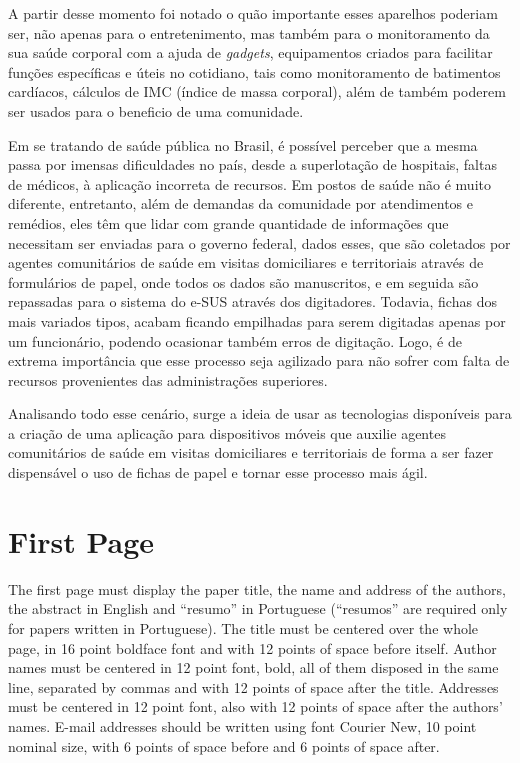 \documentclass[12pt]{article}
\begin{document}
A partir desse momento foi notado o quão importante esses aparelhos poderiam ser, não apenas para o entretenimento, mas também para o monitoramento da sua saúde corporal com a ajuda de \textit{gadgets}, equipamentos criados para facilitar funções específicas e úteis no cotidiano, tais como monitoramento de batimentos cardíacos, cálculos de IMC (índice de massa corporal), além de também poderem ser usados para o beneficio de uma comunidade.

Em se tratando de saúde pública no Brasil, é possível perceber que a mesma passa por imensas dificuldades no país, desde a superlotação de hospitais, faltas de médicos, à aplicação incorreta de recursos. Em postos de saúde não é muito diferente, entretanto, além de demandas da comunidade por atendimentos e remédios, eles têm que lidar com grande quantidade de informações que necessitam ser enviadas para o governo federal, dados esses, que são coletados por agentes comunitários de saúde em visitas domiciliares e territoriais através de formulários de papel, onde todos os dados são manuscritos, e em seguida são repassadas para o sistema do e-SUS através dos digitadores.
Todavia, fichas dos mais variados tipos, acabam ficando empilhadas para serem digitadas apenas por um funcionário, podendo ocasionar também erros de digitação.  Logo, é de extrema importância que esse processo seja agilizado para não sofrer com falta de recursos provenientes das administrações superiores.

Analisando todo esse cenário, surge a ideia de usar as tecnologias disponíveis para a criação de uma aplicação para dispositivos móveis que auxilie agentes comunitários de saúde em visitas domiciliares e territoriais de forma a ser fazer dispensável o uso de fichas de papel e tornar esse processo mais ágil.

\section{First Page} \label{sec:firstpage}

The first page must display the paper title, the name and address of the
authors, the abstract in English and ``resumo'' in Portuguese (``resumos'' are
required only for papers written in Portuguese). The title must be centered
over the whole page, in 16 point boldface font and with 12 points of space
before itself. Author names must be centered in 12 point font, bold, all of
them disposed in the same line, separated by commas and with 12 points of
space after the title. Addresses must be centered in 12 point font, also with
12 points of space after the authors' names. E-mail addresses should be
written using font Courier New, 10 point nominal size, with 6 points of space
before and 6 points of space after.
\end{document}

